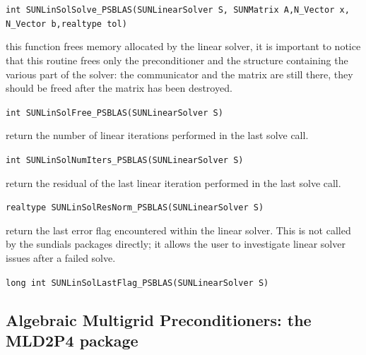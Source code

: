 \documentclass[twoside,a4paper]{refart}
\theoremstyle{definition}
\begin{document}
\begin{description}
 \lstinline[style=CStyle]|int SUNLinSolSolve_PSBLAS(SUNLinearSolver S, SUNMatrix A,N_Vector x, N_Vector b,realtype tol)|

\item[\fbox{\texttt{SUNLinSolFree\_PSBLAS}}] this function frees memory allocated by the linear solver, it is important to notice that this routine frees only the preconditioner and the structure containing the various part of the solver: the communicator and the matrix are still there, they should be freed after the matrix has been destroyed.

 \lstinline[style=CStyle]|int SUNLinSolFree_PSBLAS(SUNLinearSolver S)|

\item[\fbox{\texttt{SUNLinSolNumIters\_PSBLAS}}] return the number of linear iterations
performed in the last solve call.

 \lstinline[style=CStyle]|int SUNLinSolNumIters_PSBLAS(SUNLinearSolver S)|

\item[\fbox{\texttt{SUNLinSolResNorm\_PSBLAS}}] return the residual of the last linear iteration performed in the last solve call.

 \lstinline[style=CStyle]|realtype SUNLinSolResNorm_PSBLAS(SUNLinearSolver S)|

\item[\fbox{\texttt{SUNLinSolLastFlag\_PSBLAS}}] return the last error flag encountered
within the linear solver. This is not called by the sundials packages directly; it allows
the user to investigate linear solver issues after a failed solve.

 \lstinline[style=CStyle]|long int SUNLinSolLastFlag_PSBLAS(SUNLinearSolver S)|
\end{description}

\subsection{Algebraic Multigrid Preconditioners: the MLD2P4 package}\label{sec:mld2p4}
\end{document}
